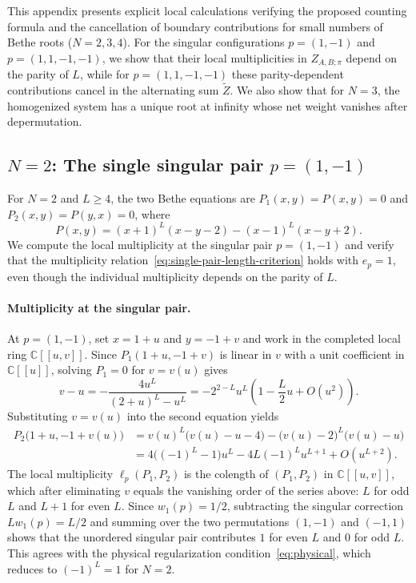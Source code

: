 \documentclass[11pt]{article}
\theoremstyle{definition}
\newcommand{\C}{\mathbb{C}}
\begin{document}
This appendix presents explicit local calculations verifying the proposed counting
formula and the cancellation of boundary contributions for small
numbers of Bethe roots ($N=2,3,4$). For the singular configurations $p=(1,-1)$ and
$p=(1,1,-1,-1)$, we show that their local multiplicities in $Z_{A,B;\pi}$
depend on the parity of $L$, while for $p=(1,1,-1,-1)$ these parity-dependent contributions
cancel in the alternating sum $\tilde{Z}$. We also show that for $N=3$, the homogenized system has a unique root at
infinity whose net weight vanishes after depermutation.

\subsection{\texorpdfstring{$N=2$}{N=2}: The single singular pair \texorpdfstring{$p=(1,-1)$}{p=(1,-1)}}

For $N=2$ and $L\ge 4$, the two Bethe equations are $P_1(x,y)=P(x,y)=0$ and
$P_2(x,y)=P(y,x)=0$, where
\[
 P(x,y)=(x+1)^L(x-y-2)-(x-1)^L(x-y+2).
\]
We compute the local multiplicity at the singular pair $p=(1,-1)$ and verify that the multiplicity relation~\eqref{eq:single-pair-length-criterion} holds with $e_p=1$, even though the individual multiplicity depends on the parity of $L$.

\paragraph{Multiplicity at the singular pair.}
At $p=(1,-1)$, set $x=1+u$ and $y=-1+v$ and work in the completed
local ring $\C[[u,v]]$. Since $P_1(1+u,-1+v)$ is linear in $v$ with a unit
coefficient in $\C[[u]]$, solving $P_1=0$ for $v=v(u)$ gives
\[
 v-u=-\frac{4u^L}{(2+u)^L-u^L}
     =-2^{2-L}u^L\left(1-\frac{L}{2}u+O(u^2)\right).
\]
Substituting $v=v(u)$ into the second equation yields
\[
 \begin{aligned}
 P_2\bigl(1+u,-1+v(u)\bigr)
 &=v(u)^L\bigl(v(u)-u-4\bigr)-\bigl(v(u)-2\bigr)^L\bigl(v(u)-u\bigr)\\
 &=4\bigl((-1)^L-1\bigr)u^L
   -4L(-1)^L u^{L+1}+O(u^{L+2}).
 \end{aligned}
\]
The local multiplicity $\ell_p(P_1,P_2)$ is the colength of $(P_1,P_2)$ in $\C[[u,v]]$, which after eliminating $v$ equals the vanishing
order of the series above: $L$ for odd $L$ and $L+1$ for even $L$.
Since $w_1(p)=1/2$, subtracting the singular correction $Lw_1(p)=L/2$ and summing over the two permutations $(1,-1)$ and $(-1,1)$ shows that the unordered singular pair contributes $1$
for even $L$ and $0$ for odd $L$. This agrees with the physical regularization
condition~\eqref{eq:physical}, which reduces to $(-1)^L=1$ for $N=2$.
\end{document}
